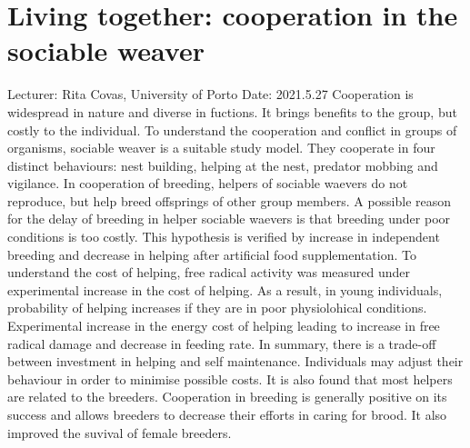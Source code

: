 \documentclass[11pt]{article}
\begin{document}
  \section{Living together: cooperation in the sociable weaver}
  Lecturer: Rita Covas, University of Porto
  \newline
  Date: 2021.5.27
  \newline
  Cooperation is widespread in nature and diverse in fuctions. 
  It brings benefits to the group, but costly to the individual. 
  To understand the cooperation and conflict in groups of organisms, sociable weaver is a suitable study model. 
  They cooperate in four distinct behaviours: nest building, helping at the nest, predator mobbing and vigilance. 
  \newline
  In cooperation of breeding, helpers of sociable waevers do not reproduce, but help breed offsprings of other group members. 
  A possible reason for the delay of breeding in helper sociable waevers is that breeding under poor conditions is too costly. 
  This hypothesis is verified by increase in independent breeding and decrease in helping after artificial food supplementation. 
  \newline
  To understand the cost of helping, free radical activity was measured under experimental increase in the cost of helping. 
  As a result, in young individuals, probability of helping increases if they are in poor physiolohical conditions. 
  Experimental increase in the energy cost of helping leading to increase in free radical damage and decrease in feeding rate. 
  \newline
  In summary, there is a trade-off between investment in helping and self maintenance. Individuals may adjust their behaviour in order to minimise possible costs.
  \newline
  It is also found that most helpers are related to the breeders. 
  Cooperation in breeding is generally positive on its success and allows breeders to decrease their efforts in caring for brood. 
  It also improved the suvival of female breeders.

  \newpage
\end{document}
